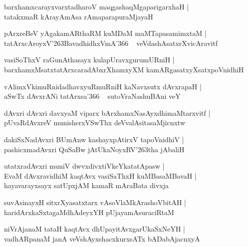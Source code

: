 \documentclass[twoside,12pt,openright]{book}
\def\S{\char'263}
\newcounter{shloka}[chapter]
\begin{document}
\begin{shloka}%
barxhamxcarayxvarxtadharoV maqgashaqMgaparigarxhaH |\\
tatakxmaR kArayAmAsa rAmaparapuraMjayaH 
\end{shloka}

\begin{shloka}%
pArxreBeV yAgakamARthaRM kuMDaM maMTapasamimxtaM |\\
tatArxcAroyxV\S BavadhidhxVmA\char'366 ~ veVdashAsatxrXvicAravitf
\end{shloka}

\begin{shloka}%
vasiSoThxV raGunAthasayx kulapUravxgurumURniH |\\
barxhamxMsatxtatArxcaradAbxrXhamxyXM kamARgasatxyXsatxpoVnidhiH
\end{shloka}

\begin{shloka}%
vAlimxVkimuRnidadhavxyuRmuRniH kaNavxsutx dAvxrapaH |\\
aSwTx dAvxrANi tatArxsa\char'366 ~ sutoVraNashuBAni veY
\end{shloka}

\begin{shloka}%
dAvxri dAvxri davxyaM viparx bArxhamxNasAyxdhimaMtarxvitf |\\
pUvaRdAvxreV munisherxVSwThx deVvalAsitasaMjicnxtw
\end{shloka}

\begin{shloka}%
dakiSxNadAvxri BUmAnw kashayxpAtirxV tapoVnidhiV |\\
pashicxmadAvxri QuSaBw jAtUkaNoyxRV\S tha jAbaliH
\end{shloka}

\begin{shloka}%
utatxradAvxri muniV dwvxdivxtiVkeYkatatApasw |\\
EvaM dAvxravidhiM kaqtAvx vasiSaThxH kuMBasaMBavaH |\\
hayavarayxsayx satUpxjAM kamaR mAraBata divxja
\end{shloka}

\begin{shloka}%
suvAsinayxH sitxrXyasatxtarx vAsoVlaMkArashoVbitAH |\\
haridArxkaSxtagaMdhAdeyxYH pUjayamAsuraciRtaM 
\end{shloka}

\begin{shloka}%
niVrAjanaM tataH kaqtAvx dhUpayitAvxgarUkaSxNeYH |\\
vadhARpanaM janA veVshAyxshacxkurxsATx bADabAjacnxyA
\end{shloka}
\end{document}
